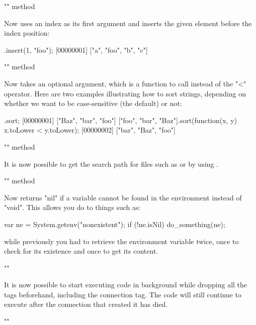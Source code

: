 \begin{description}
\item "" method

  Now uses an index as its first argument and inserts the given element
  before the index position:

\begin{urbiscript}
["a", "b", "c"].insert(1, "foo");
[00000001] ["a", "foo", "b", "c"]
\end{urbiscript}

\item "" method

  Now takes an optional argument, which is a function to call instead of the
  "<" operator. Here are two examples illustrating how to sort strings,
  depending on whether we want to be case-sensitive (the default) or not:

\begin{urbiscript}
.sort;
[00000001] ["Baz", "bar", "foo"]
["foo", "bar", "Baz"].sort(function(x, y) {x.toLower < y.toLower});
[00000002] ["bar", "Baz", "foo"]
\end{urbiscript}

\item "" method

  It is now possible to get the search path for files such as 
  or  by using .

\item "" method

  Now returns "nil" if a variable cannot be found in the environment instead
  of "void". This allows you do to things such as:

\begin{urbiscript}
var ne = System.getenv("nonexistent");
if (!ne.isNil) do_something(ne);
\end{urbiscript}

  \noindent
  while previously you had to retrieve the environment variable twice, once
  to check for its existence and once to get its content.

\item ""

  It is now possible to start executing code in background while dropping
  all the tags beforehand, including the connection tag. The code will still
  continue to execute after the connection that created it has died.

\item ""


\end{description}
